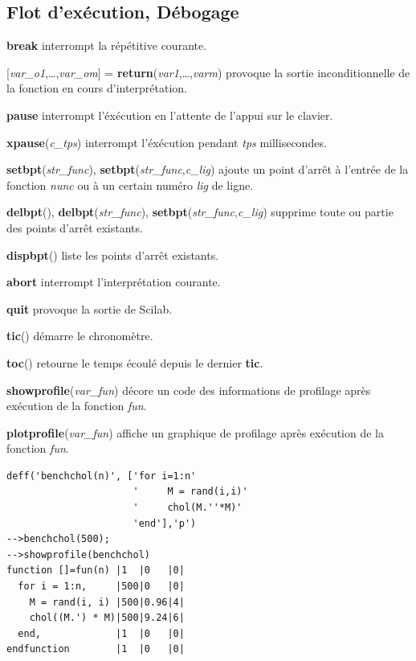 \documentclass{article}
\begin{document}
\begin{multicols}{3}
\subsection{Flot d'exécution, Débogage}
\begin{description}
\item{\textbf{break}} interrompt la répétitive courante.
\item{[\textit{var\_o1},\ldots,\textit{var\_om}] = \textbf{return}(\textit{var1},\ldots,\textit{varm})} provoque la sortie inconditionnelle de la fonction en cours d'interprétation.
\item{\textbf{pause}} interrompt l'éxécution en l'attente de l'appui sur le clavier.
\item{\textbf{xpause}(\textit{c\_tps})} interrompt l'éxécution pendant \textit{tps} millisecondes.
\item{\textbf{setbpt}(\textit{str\_func}), \textbf{setbpt}(\textit{str\_func},\textit{c\_lig})} ajoute un point d'arrêt à l'entrée de la fonction \textit{nunc} ou à un certain numéro \textit{lig} de ligne.
\item{\textbf{delbpt}(), \textbf{delbpt}(\textit{str\_func}), \textbf{setbpt}(\textit{str\_func},\textit{c\_lig})} supprime toute ou partie des points d'arrêt existants.
\item{\textbf{dispbpt}()} liste les points d'arrêt existants.
\item{\textbf{abort}} interrompt l'interprétation courante.
\item{\textbf{quit}} provoque la sortie de Scilab.
\item{\textbf{tic}()} démarre le chronomètre.
\item{\textbf{toc}()} retourne le temps écoulé depuis le dernier \textbf{tic}.
\item{\textbf{showprofile}(\textit{var\_fun})} décore un code des informations de  profilage après exécution de la fonction \textit{fun}.
\item{\textbf{plotprofile}(\textit{var\_fun})} affiche un graphique de profilage après exécution de la fonction \textit{fun}.
\begin{verbatim}
deff('benchchol(n)', ['for i=1:n'
                      '     M = rand(i,i)'
                      '     chol(M.''*M)'
                      'end'],'p')
-->benchchol(500);
-->showprofile(benchchol)
function []=fun(n) |1  |0   |0|
  for i = 1:n,     |500|0   |0|
    M = rand(i, i) |500|0.96|4|
    chol((M.') * M)|500|9.24|6|
  end,             |1  |0   |0|
endfunction        |1  |0   |0|
\end{verbatim}
\end{description}

\section{}

\end{multicols}
\end{document}
